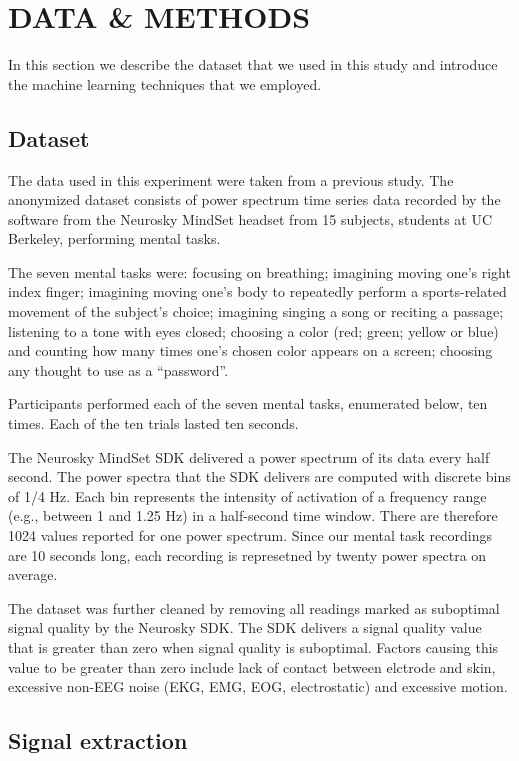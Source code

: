 
\section{\uppercase{Data \& methods}}

In this section we describe the dataset that we used in this study and introduce the machine learning techniques that we employed.

\subsection{Dataset}

The data used in this experiment were taken from a previous study. \cite{adams_i_2013} The anonymized dataset consists of power spectrum time series data recorded by the software from the Neurosky MindSet headset from 15 subjects, students at UC Berkeley, performing mental tasks. 

The seven mental tasks were: focusing on breathing; imagining moving one's right index finger; imagining moving one's body to repeatedly perform a sports-related movement of the subject's choice; imagining singing a song or reciting a passage; listening to a tone with eyes closed; choosing a color (red; green; yellow or blue) and counting how many times one's chosen color appears on a screen; choosing any thought to use as a ``password''.

Participants performed each of the seven mental tasks, enumerated below, ten times. Each of the ten trials lasted ten seconds.

The Neurosky MindSet SDK delivered a power spectrum of its data every half second. The power spectra that the SDK delivers are computed with discrete bins of 1/4 Hz. Each bin represents the intensity of activation of a frequency range (e.g., between 1 and 1.25 Hz) in a half-second time window. There are therefore 1024 values reported for one power spectrum. Since our mental task recordings are 10 seconds long, each recording is represetned by twenty power spectra on average.

The dataset was further cleaned by removing all readings marked as suboptimal signal quality by the Neurosky SDK. The SDK delivers a signal quality value that is greater than zero when signal quality is suboptimal. Factors causing this value to be greater than zero include lack of contact between elctrode and skin, excessive non-EEG noise (EKG, EMG, EOG, electrostatic) and excessive motion.

\subsection{Signal extraction}

